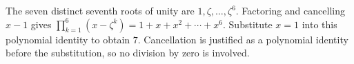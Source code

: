 The seven distinct seventh roots of unity are $1,\zeta,\ldots,\zeta^6$. Factoring and cancelling $x-1$ gives $\prod_{k=1}^{6}(x-\zeta^k)=1+x+x^2+\cdots+x^6$. Substitute $x=1$ into this polynomial identity to obtain $\boxed{7}$. Cancellation is justified as a polynomial identity before the substitution, so no division by zero is involved.
